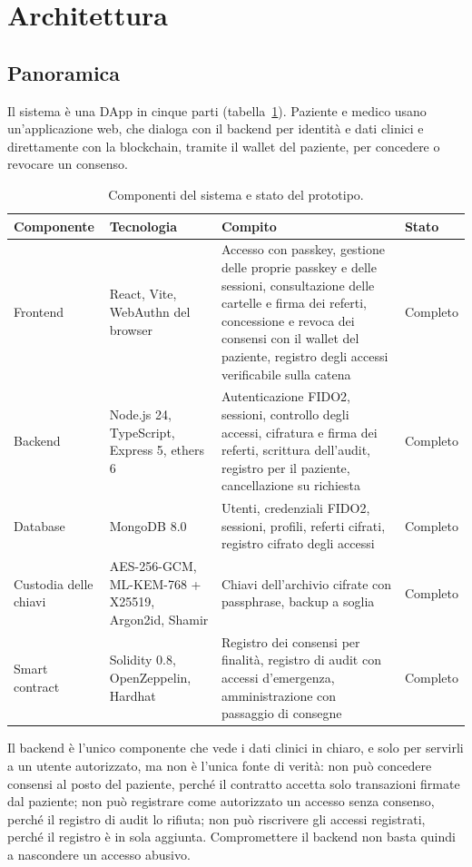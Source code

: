 \section{Architettura}\label{sec:architettura}

\subsection{Panoramica}
Il sistema è una DApp in cinque parti (tabella~\ref{tab:componenti}). Paziente e medico usano un'applicazione web, che dialoga con il backend per identità e dati clinici e direttamente con la blockchain, tramite il wallet del paziente, per concedere o revocare un consenso.

\begin{table}[H]
\centering\footnotesize
\renewcommand{\arraystretch}{1.2}
\begin{tabular}{@{}p{}p{}p{}p{}@{}}
\toprule
Componente & Tecnologia & Compito & Stato\\
\midrule
Frontend & React, Vite, WebAuthn del browser & Accesso con passkey, gestione delle proprie passkey e delle sessioni, consultazione delle cartelle e firma dei referti, concessione e revoca dei consensi con il wallet del paziente, registro degli accessi verificabile sulla catena & Completo\\
Backend & Node.js 24, TypeScript, Express 5, ethers 6 & Autenticazione FIDO2, sessioni, controllo degli accessi, cifratura e firma dei referti, scrittura dell'audit, registro per il paziente, cancellazione su richiesta & Completo\\
Database & MongoDB 8.0 & Utenti, credenziali FIDO2, sessioni, profili, referti cifrati, registro cifrato degli accessi & Completo\\
Custodia delle chiavi & AES-256-GCM, ML-KEM-768 + X25519, Argon2id, Shamir & Chiavi dell'archivio cifrate con passphrase, backup a soglia & Completo\\
Smart contract & Solidity 0.8, OpenZeppelin, Hardhat & Registro dei consensi per finalità, registro di audit con accessi d'emergenza, amministrazione con passaggio di consegne & Completo\\
\bottomrule
\end{tabular}
\caption{Componenti del sistema e stato del prototipo.}\label{tab:componenti}
\end{table}

Il backend è l'unico componente che vede i dati clinici in chiaro, e solo per servirli a un utente autorizzato, ma non è l'unica fonte di verità: non può concedere consensi al posto del paziente, perché il contratto accetta solo transazioni firmate dal paziente; non può registrare come autorizzato un accesso senza consenso, perché il registro di audit lo rifiuta; non può riscrivere gli accessi registrati, perché il registro è in sola aggiunta. Compromettere il backend non basta quindi a nascondere un accesso abusivo.

